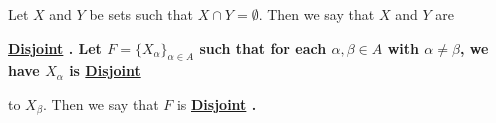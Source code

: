 \newcommand{\Disjoint}[0]{
    \bf \hyperref[def:Disjoint]{Disjoint} \rm
}
\newcommand{\Disjointedness}[0]{
    \bf \hyperref[def:Disjoint]{Disjointedness} \rm
}\begin{df}[Disjoint]
\label{def:Disjoint}

\rm
    Let $X$ and $Y$ be sets such that 
    $X \cap Y = \emptyset$. 
    Then we say that $X$ and $Y$ are 
    \Disjoint. 
    Let $F=\{X_{\alpha}\}_{\alpha \in A}$ 
    such that for each $\alpha, \beta \in A$ 
    with $\alpha \neq \beta$, we have 
    $X_\alpha$ 
    is \Disjoint
    to 
    $X_{\beta}$. 
    Then we say that $F$ is \Disjoint. 
\end{df}
